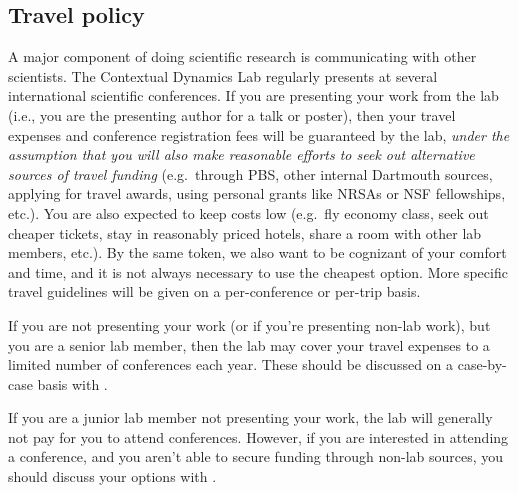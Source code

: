 \documentclass{tufte-book} %
\begin{document}
 \subsection{Travel policy}
 A major component of doing scientific
 research is communicating with other scientists.  The Contextual
 Dynamics Lab regularly presents at several international scientific
 conferences.  If you are presenting your work from the lab (i.e., you
 are the presenting author for a talk or poster), then your travel
 expenses and conference registration fees will be guaranteed by the
 lab, \textit{under the assumption that you will also make reasonable
   efforts to seek out alternative sources of travel funding} (e.g.\
 through PBS, other internal Dartmouth sources, applying for travel
 awards, using personal grants like NRSAs or NSF fellowships, etc.).
 You are also expected to keep costs low (e.g.\ fly economy class,
 seek out cheaper tickets, stay in reasonably priced hotels, share a
 room with other lab members, etc.).  By the same token, we also want
 to be cognizant of your comfort and time, and it is not always
 necessary to use the cheapest option.  More specific travel
 guidelines will be given on a per-conference or per-trip basis.

 If you are not presenting your work (or if you're presenting non-lab
 work), but you are a senior lab member, then the lab may cover your travel
 expenses to a limited number of conferences each year.  These should
 be discussed on a case-by-case basis with \director.

If you are a junior lab member not presenting your work, the lab
will generally not pay for you to attend conferences.  However, if you
are interested in attending a conference, and you aren't able to
secure funding through non-lab sources, you should discuss your
options with \director.
\end{document}
